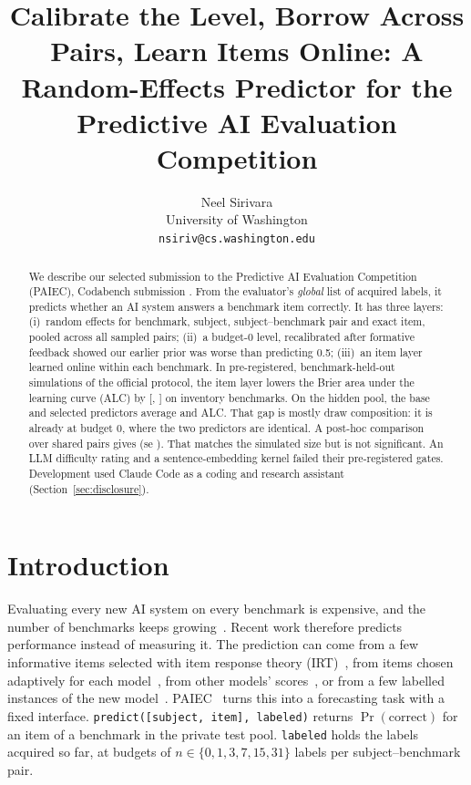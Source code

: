 \documentclass{article}
\title{Calibrate the Level, Borrow Across Pairs, Learn Items Online: A Random-Effects Predictor for the Predictive AI Evaluation Competition}
\author{%
  Neel Sirivara\\
  University of Washington\\
  \texttt{nsiriv@cs.washington.edu}
}
\begin{document}
\maketitle

\begin{abstract}
We describe our selected submission to the Predictive AI Evaluation Competition (PAIEC), Codabench submission \SubId. From the evaluator's \emph{global} list of acquired labels, it predicts whether an AI system answers a benchmark item correctly. It has three layers:
(i)~random effects for benchmark, subject, subject--benchmark pair and exact item, pooled across all sampled pairs;
(ii)~a budget-0 level, recalibrated after formative feedback showed our earlier prior was worse than predicting 0.5;
(iii)~an item layer learned online within each benchmark.
In pre-registered, benchmark-held-out simulations of the official protocol, the item layer lowers the Brier area under the learning curve (ALC) by \WcInvMean{} [\WcInvLo, \WcInvHi] on inventory benchmarks.
On the hidden pool, the base and selected predictors average \ArBaseMean{} and \ArWtwoMean{} ALC. That gap is mostly draw composition: it is already \ArDiffBZero{} at budget 0, where the two predictors are identical. A post-hoc comparison over shared pairs gives \PmMean{} (se \PmSe). That matches the simulated size but is not significant.
An LLM difficulty rating and a sentence-embedding kernel failed their pre-registered gates. Development used Claude Code as a coding and research assistant (Section~\ref{sec:disclosure}).
\end{abstract}

\section{Introduction}
\label{sec:intro}

Evaluating every new AI system on every benchmark is expensive, and the number of benchmarks keeps growing~\citep{liang2022helm}. Recent work therefore predicts performance instead of measuring it. The prediction can come from a few informative items selected with item response theory (IRT)~\citep{polo2024tinybenchmarks,kipnis2025metabench,perlitz2024efficient}, from items chosen adaptively for each model~\citep{hofmann2025fluid,zhuang2025position}, from other models' scores~\citep{ruan2024observational,ye2023predictable}, or from a few labelled instances of the new model~\citep{pacchiardi2024hundred}. PAIEC~\citep{paiec2026} turns this into a forecasting task with a fixed interface. \texttt{predict([subject, item], labeled)} returns $\Pr(\text{correct})$ for an item of a benchmark in the private test pool. \texttt{labeled} holds the labels acquired so far, at budgets of $n\in\{0,1,3,7,15,31\}$ labels per subject--benchmark pair.
\end{document}
